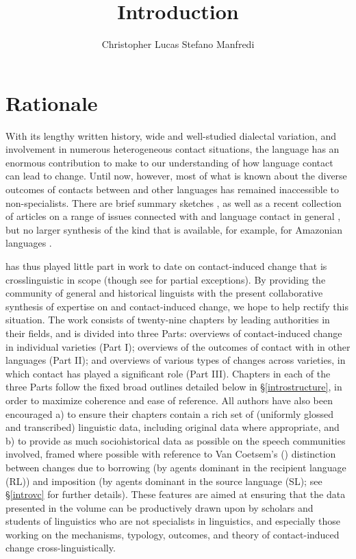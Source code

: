 \documentclass[output=paper]{langsci/langscibook}
\author{Christopher Lucas\affiliation{SOAS University of London}\lastand
 Stefano Manfredi\affiliation{CNRS, SeDyL}
}
\title{Introduction}
\begin{document}
\label{introintro}

\section{Rationale}
With its lengthy written history, wide and well-studied dialectal variation, and involvement in numerous heterogeneous contact situations, the  language has an enormous contribution to make to our understanding of how language contact can lead to change. Until now, however, most of what is known about the diverse outcomes of contacts between  and other languages has remained inaccessible to non-specialists. There are brief summary sketches \citep{Thomason2011,Versteegh2001article,Versteegh2010,Manfredi2018}, as well as a recent collection of articles on a range of issues connected with  and language contact in general \citep{ManfrediTosco2018}, but no larger synthesis of the kind that is available, for example, for Amazonian languages \citep{Aikhenvald2002}.

 has thus played little part in work to date on contact-induced change that is crosslinguistic in
scope (though see \citealt{Matras2009,Trudgill2011} for partial exceptions). By providing the community of general and historical linguists with the present collaborative synthesis of expertise on  and contact-induced change, we hope to help rectify this situation. The work consists of twenty-nine chapters by leading authorities in their fields, and is divided into three Parts: overviews of contact-induced change in individual  varieties (Part I); overviews of the outcomes of contact with  in other languages (Part II); and overviews of various types of changes across  varieties, in which contact has played a significant role (Part III). Chapters in each of the three Parts follow the fixed broad outlines detailed below in §\ref{introstructure}, in order to maximize coherence and ease of reference. All authors have also been encouraged a) to ensure their chapters contain a rich set of (uniformly glossed and transcribed) linguistic data, including original data where appropriate, and b) to provide as much sociohistorical data as possible on the speech communities involved, framed where possible with reference to Van Coetsem’s (\citeyear{VanCoetsem1988,VanCoetsem2000}) distinction between changes due to borrowing (by agents dominant in the {recipient language} ({RL})) and {imposition} (by agents dominant in the {source language} ({SL}); see §\ref{introvc} for further details). These features are aimed at ensuring that the data presented in the volume can be productively drawn upon by scholars and students of linguistics who are not specialists in
 linguistics, and especially those working on the mechanisms, typology, outcomes, and theory of contact-induced change cross-linguistically.
\end{document}

